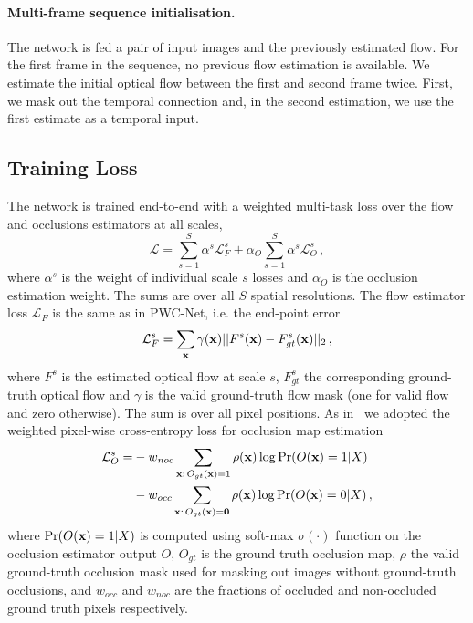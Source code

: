 \documentclass[runningheads]{llncs}
\begin{document}
\paragraph{\bf\textbf{Multi-frame sequence initialisation.}}
The network is fed a pair of input images and the previously estimated flow. 
For the first frame in the sequence, no previous flow estimation is available.
We estimate the initial optical flow between the first and second frame twice. First, we mask out the temporal connection and, in the second estimation, we use the first estimate as a temporal input.


\subsection{Training Loss}
The network is trained end-to-end with a weighted multi-task loss over the flow and occlusions estimators at all scales,
\begin{equation}
\mathcal{L} = \sum_{s=1}^S \alpha^s \mathcal{L}^{s}_F + \alpha_O \sum_{s=1}^S  \alpha^s \mathcal{L}^{s}_O\,,
\end{equation}
where $\alpha^s$ is the weight of individual scale $s$ losses and $\alpha_O$ is the occlusion estimation weight. The sums are over all $S$ spatial resolutions.
The flow estimator loss $\mathcal{L}_F$ is the same as in PWC-Net, i.e. the end-point error
\begin{equation}
\mathcal{L}^s_F = \sum_{\bf x} \gamma({\bf x}) || F^s({\bf x}) - F_{gt}^s({\bf x}) ||_2\, ,
\end{equation}
where $F^s$ is the estimated optical flow at scale $s$, $F^s_{gt}$ the corresponding ground-truth optical flow and $\gamma$ is the valid ground-truth flow mask (one for valid flow and zero otherwise). The sum is over all pixel positions.
As in~\cite{Xie2015,Caelles2017} we adopted the  weighted pixel-wise cross-entropy loss for occlusion map estimation
\begin{equation}
\begin{split}
\mathcal{L}_O^s = &- w_{noc} \sum_{{\bf x}:\, O_{gt}({\bf x}) = 1} \rho({\bf x}) \log {\rm Pr}(O({\bf x}) = 1|X)\\
&- w_{occ} \sum_{{\bf x}:\, O_{gt}(\bf x) = 0} \rho({\bf x})  \log {\rm Pr}(O({\bf x}) = 0|X)\,,
\end{split}
\end{equation}
where ${\rm Pr}(O({\bf x}) = 1|X)$ is computed using soft-max $\sigma(\cdot)$ function on the occlusion estimator output $O$, $O_{gt}$ is the ground truth occlusion map, $\rho$ the valid ground-truth occlusion mask used for masking out images without ground-truth occlusions, and $w_{occ}$ and $w_{noc}$ are the fractions of occluded and non-occluded ground truth pixels respectively.
\end{document}
